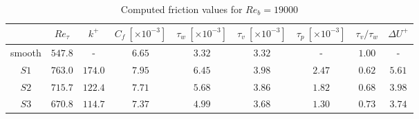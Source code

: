 \begin{table}
    \centering
    \caption[Computed friction values for $Re_b = 19000$]{Computed friction values for $Re_b = 19000$}
    \begin{tabular}{c c c c c c c c c}
        \toprule
                & $Re_\tau$ & $k^+$     & $C_f\ [\times10^{-3}]$    & $\tau_w\ [\times10^{-3}]$    & $\tau_v\ [\times10^{-3}]$ & $\tau_p\ [\times10^{-3}]$ & $\tau_v/\tau_w$   & $\Delta U^+$\\
        \midrule
        smooth  & $547.8$   & -         & $6.65$                    & $3.32$                        & $3.32$                    & -                         & $1.00$            & - \\
        $S1$    & $763.0$   & $174.0$   & $7.95$                    & $6.45$                        & $3.98$                    & $2.47$                    & $0.62$            & $5.61$\\
        $S2$    & $715.7$   & $122.4$   & $7.71$                    & $5.68$                        & $3.86$                    & $1.82$                    & $0.68$            & $3.98$\\
        $S3$    & $670.8$   & $114.7$   & $7.37$                    & $4.99$                        & $3.68$                    & $1.30$                    & $0.73$            & $3.74$\\
        \bottomrule
    \end{tabular}
    \label{tab: friction values 19000 Reb}
\end{table}



